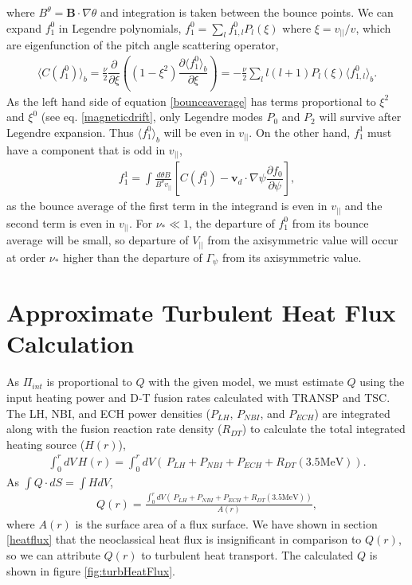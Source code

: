 \documentclass{article}
\numberwithin{figure}{section}
\numberwithin{equation}{section}
\newcommand{\partder}[2]{\dfrac{\partial  #1}{\partial  #2}} %
\begin{document}
where $B^{\theta} = \bm{B} \cdot \nabla \theta$ and integration is taken between the bounce points. We can expand $f_1^0$ in Legendre polynomials, $f_1^0 = \sum_l f_{1,l}^0 P_l(\xi)$ where $\xi = v_{||}/v$, which are eigenfunction of the pitch angle scattering operator, 
\begin{gather}
\langle C(f_1^0) \rangle_b = \frac{\nu}{2} \partder{}{\xi} \left( \left(1 - \xi^2\right) \partder{\langle f^0_1\rangle_b}{\xi}  \right) = -\frac{\nu}{2} \sum_l l(l+1)  P_l(\xi) \langle f_{1,l}^0 \rangle_b.
\end{gather}
As the left hand side of equation \ref{bounceaverage} has terms proportional to $\xi^2$ and $\xi^0$ (see eq. \ref{magneticdrift}, only Legendre modes $P_0$ and $P_2$ will survive after Legendre expansion. Thus $\langle f_1^0 \rangle_b$ will be even in $v_{||}$. On the other hand, $f_{1}^1$ must have a component that is odd in $v_{||}$,
\begin{gather}
f_{1}^1 = \int \frac{d \theta B}{B^{\theta} v_{||}} \left[C(f_1^0) - \bm{v}_d \cdot \nabla \psi \partder{f_0}{\psi} \right],
\end{gather}
as the bounce average of the first term in the integrand is even in $v_{||}$ and the second term is even in $v_{||}$.
For $\nu_* \ll 1$, the departure of $f_1^0$ from its bounce average will be small, so departure of $V_{||}$ from the axisymmetric value will occur at order $\nu_*$ higher than the departure of $\Gamma_{\psi}$ from its axisymmetric value.

\section{Approximate Turbulent Heat Flux Calculation}\label{turbQ}

As $\Pi_{int}$ is proportional to $Q$ with the given model, we must estimate $Q$ using the input heating power and D-T fusion rates calculated with TRANSP and TSC. The LH, NBI, and ECH power densities ($P_{LH}$, $P_{NBI}$, and $P_{ECH}$) are integrated along with the fusion reaction rate density ($R_{DT}$) to calculate the total integrated heating source ($H(r)$),
\begin{gather}
\int_0^r dV \, H(r) = \int_0^r dV \left(\, P_{LH} + P_{NBI} + P_{ECH} + R_{DT} (3.5 \text{MeV}) \right).
\end{gather}
As $\int Q \cdot dS = \int H dV$, 
\begin{gather}
Q(r) = \frac{\int_0^r dV \left(\, P_{LH} + P_{NBI} + P_{ECH} + R_{DT} (3.5 \text{MeV}) \right)}{A(r)},
\end{gather}
where $A(r)$ is the surface area of a flux surface. We have shown in section \ref{heatflux} that the neoclassical heat flux is insignificant in comparison to $Q(r)$, so we can attribute $Q(r)$ to turbulent heat transport. The calculated $Q$ is shown in figure \ref{fig:turbHeatFlux}.
\end{document}
